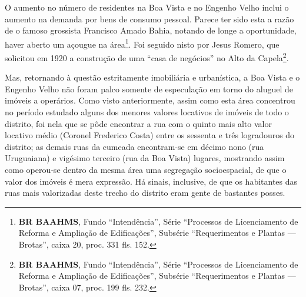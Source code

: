 O aumento no número de residentes na Boa Vista e no Engenho Velho inclui o aumento na demanda por bens de consumo pessoal. Parece ter sido esta a razão de o famoso grossista Francisco Amado Bahia, notando de longe a oportunidade, haver aberto um açougue na área\footnote{\textbf{BR BAAHMS}, Fundo ``Intendência'', Série ``Processos de Licenciamento de Reforma e Ampliação de Edificações'', Subsérie ``Requerimentos e Plantas --- Brotas'', caixa 20, proc. 331 fls. 152.}. Foi seguido nisto por Jesus Romero, que solicitou em 1920 a construção de uma ``casa de negócios'' no Alto da Capela\footnote{\textbf{BR BAAHMS}, Fundo ``Intendência'', Série ``Processos de Licenciamento de Reforma e Ampliação de Edificações'', Subsérie ``Requerimentos e Plantas --- Brotas'', caixa 07, proc. 199 fls. 232.}. 


Mas, retornando à questão estritamente imobiliária e urbanística, a Boa Vista e o Engenho Velho não foram palco somente de especulação em torno do aluguel de imóveis a operários. Como visto anteriormente, assim como esta área concentrou no período estudado alguns dos menores valores locativos de imóveis de todo o distrito, foi nela que se pôde encontrar a rua com o quinto mais alto valor locativo médio (Coronel Frederico Costa) entre os sessenta e três logradouros do distrito; as demais ruas da cumeada encontram-se em décimo nono (rua Uruguaiana) e vigésimo terceiro (rua da Boa Vista) lugares, mostrando assim como operou-se dentro da mesma área uma segregação socioespacial, de que o valor dos imóveis é mera expressão. Há sinais, inclusive, de que os habitantes das ruas mais valorizadas deste trecho do distrito eram gente de bastantes posses.


